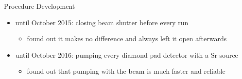 \begin{frame}{Procedure Development}

	\begin{minipage}[c][3cm]{\textwidth}
		\begin{itemize}\itemfill
			\item until October 2015: closing beam shutter before every run
				\begin{itemize}
					\item found out it makes no difference and always left it open afterwards
				\end{itemize}\vspace*{1pt}
			\item until October 2016: pumping every diamond pad detector with a Sr-source
			\begin{itemize}
				\item found out that pumping with the beam is much faster and reliable
			\end{itemize}
		\end{itemize}
	\end{minipage}
\end{frame}
